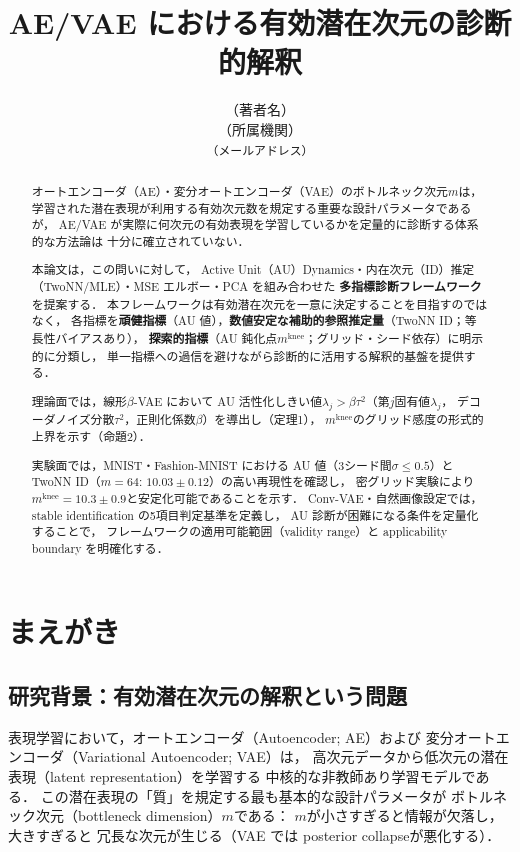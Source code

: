 \documentclass[11pt,a4paper]{jsarticle}
\title{AE/VAE における有効潜在次元の診断的解釈}
\author{（著者名）\\
{\small （所属機関）}\\
{\small \texttt{（メールアドレス）}}}
\date{}
\newcommand{\mknee}{m^{\mathrm{knee}}}
\begin{document}
\maketitle

\begin{abstract}
オートエンコーダ（AE）・変分オートエンコーダ（VAE）のボトルネック次元$m$は，
学習された潜在表現が利用する有効次元数を規定する重要な設計パラメータであるが，
AE/VAE が実際に何次元の有効表現を学習しているかを定量的に診断する体系的な方法論は
十分に確立されていない．

本論文は，この問いに対して，
Active Unit（AU）Dynamics・内在次元（ID）推定（TwoNN/MLE）・MSE エルボー・PCA を組み合わせた
\textbf{多指標診断フレームワーク}を提案する．
本フレームワークは有効潜在次元を一意に決定することを目指すのではなく，
各指標を\textbf{頑健指標}（AU 値），\textbf{数値安定な補助的参照推定量}（TwoNN ID；等長性バイアスあり），
\textbf{探索的指標}（AU 鈍化点$\mknee$；グリッド・シード依存）に明示的に分類し，
単一指標への過信を避けながら診断的に活用する解釈的基盤を提供する．

理論面では，線形$\beta$-VAE において AU 活性化しきい値$\lambda_j > \beta\tau^2$（第$j$固有値$\lambda_j$，
デコーダノイズ分散$\tau^2$，正則化係数$\beta$）を導出し（定理1），
$\mknee$のグリッド感度の形式的上界を示す（命題2）．

実験面では，MNIST・Fashion-MNIST における AU 値（3シード間$\sigma \leq 0.5$）と
TwoNN ID（$m=64$: $10.03 \pm 0.12$）の高い再現性を確認し，
密グリッド実験により$\mknee = 10.3 \pm 0.9$と安定化可能であることを示す．
Conv-VAE・自然画像設定では，stable identification の5項目判定基準を定義し，
AU 診断が困難になる条件を定量化することで，
フレームワークの適用可能範囲（validity range）と applicability boundary を明確化する．
\end{abstract}

\section{まえがき}\label{sec:intro}

\subsection{研究背景：有効潜在次元の解釈という問題}\label{sec:intro_bg}

表現学習において，オートエンコーダ（Autoencoder; AE）および
変分オートエンコーダ（Variational Autoencoder; VAE）\cite{kingma2014vae}は，
高次元データから低次元の潜在表現（latent representation）を学習する
中核的な非教師あり学習モデルである\cite{bengio2013representation}．
この潜在表現の「質」を規定する最も基本的な設計パラメータが
ボトルネック次元（bottleneck dimension）$m$である：
$m$が小さすぎると情報が欠落し，大きすぎると
冗長な次元が生じる（VAE では posterior collapse\cite{lucas2019elbo}が悪化する）．
\end{document}
